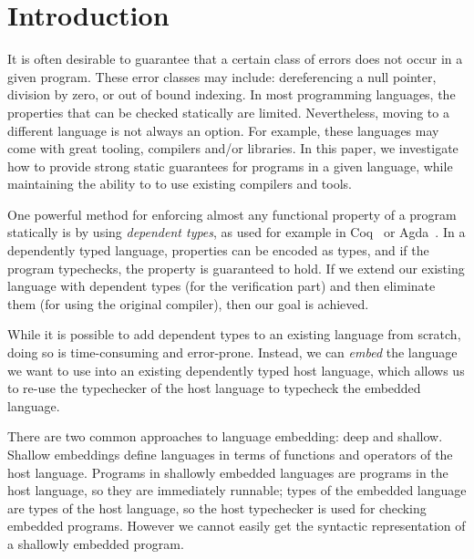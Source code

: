 \documentclass[sigplan,screen]{acmart}
\begin{document}
\section{Introduction}\label{sec:introduction}

It is often desirable to guarantee that a
certain class of errors does not occur in a given program.  These
error classes may include: dereferencing a null pointer, division
by zero, or out of bound indexing.  In most
programming languages, the properties that can be checked
statically are limited.  Nevertheless, moving to a different
language is not always an option.  For example, these languages may
come with great tooling, compilers and/or libraries.  In this paper, we
investigate how to provide strong static guarantees for programs in a
given language, while maintaining the ability to to use existing
compilers and tools.

One powerful method for enforcing almost any functional property of a
program statically is by using \emph{dependent types}, as used for
example in Coq~\cite{Coq-8-13-2} or Agda~\cite{agda-2-6-2}.  In a
dependently typed language, properties can be encoded as types, and if
the program typechecks, the property is guaranteed to hold.  If we
extend our existing language with dependent types (for the verification
part) and then eliminate them (for using the original compiler), then
our goal is achieved.

While it is possible to add dependent types to an existing language
from scratch, doing so is time-consuming and error-prone.  Instead,
we can \emph{embed} the language we want to use into an existing
dependently typed host language, which allows us to re-use the typechecker
of the host language to typecheck the embedded language.

There are two common approaches to language embedding: deep and shallow.
Shallow embeddings define lan\-gua\-ges in terms of functions and operators
of the host language.  Programs in shallowly embedded languages are programs
in the host language, so they are immediately run\-nable; types of the embedded
language are types of the host language, so the host typechecker is used for
checking embedded programs. However we cannot easily get the syntactic
representation of a shallowly embedded program.
\end{document}

